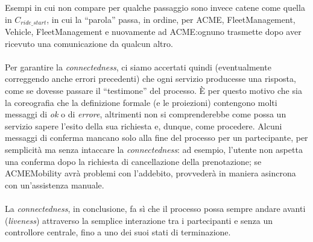 Esempi in cui non compare per qualche passaggio sono invece catene come quella
in $C_{ride\_start}$, in cui la ``parola'' passa, in ordine, per ACME,
FleetManagement, Vehicle, FleetManagement e nuovamente ad ACME:\@ ognuno
trasmette dopo aver ricevuto una comunicazione da qualcun altro.\\
\\
Per garantire la \textit{connectedness}, ci siamo accertati quindi
(eventualmente correggendo anche errori precedenti) che ogni servizio producesse
una risposta, come se dovesse passare il ``testimone'' del processo. È per
questo motivo che sia la coreografia che la definizione formale (e le
proiezioni) contengono molti messaggi di \textit{ok} o di \textit{errore},
altrimenti non si comprenderebbe come possa un servizio sapere l'esito della sua
richiesta e, dunque, come procedere. Alcuni messaggi di conferma mancano solo
alla fine del processo per un partecipante, per semplicità ma senza intaccare la
\textit{connectedness}: ad esempio, l'utente non aspetta una conferma dopo la
richiesta di cancellazione della prenotazione; se ACMEMobility avrà problemi con
l'addebito, provvederà in maniera asincrona con un'assistenza manuale.\\
\\
La \textit{connectedness}, in conclusione, fa sì che il processo possa sempre
andare avanti (\textit{liveness}) attraverso la semplice interazione tra i
partecipanti e senza un controllore centrale, fino a uno dei suoi stati di
terminazione.




%
